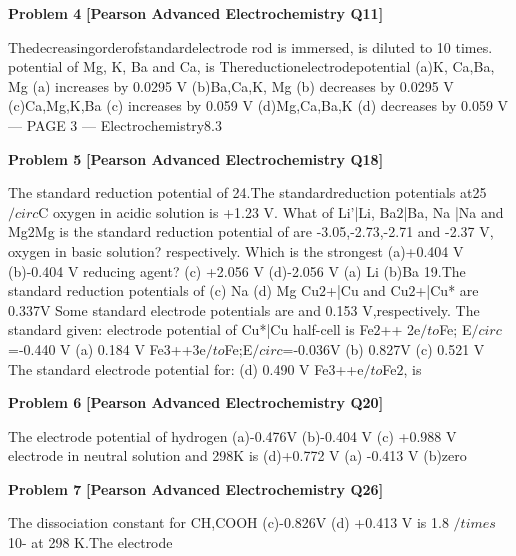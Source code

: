 \begin{problembox}
\textbf{Problem 4} \hfill \textbf{[Pearson Advanced Electrochemistry Q11]}
\label{q:ext-pearson-4}

Thedecreasingorderofstandardelectrode
rod is immersed, is diluted to 10 times.
potential of Mg, K, Ba and Ca, is
Thereductionelectrodepotential
(a)K, Ca,Ba, Mg
(a) increases by 0.0295 V
(b)Ba,Ca,K, Mg
(b) decreases by 0.0295 V
(c)Ca,Mg,K,Ba
(c) increases by 0.059 V
(d)Mg,Ca,Ba,K
(d) decreases by 0.059 V
--- PAGE 3 ---
Electrochemistry8.3
\end{problembox}

\begin{problembox}
\textbf{Problem 5} \hfill \textbf{[Pearson Advanced Electrochemistry Q18]}
\label{q:ext-pearson-5}

The standard reduction potential of
24.The standardreduction potentials at25$/circ$C
oxygen in acidic solution is +1.23 V. What
of Li'|Li, Ba$2$|Ba, Na |Na and Mg$2$Mg
is the standard reduction potential of
are -3.05,-2.73,-2.71 and -2.37 V,
oxygen in basic solution?
respectively. Which is the strongest
(a)+0.404 V
(b)-0.404 V
reducing agent?
(c) +2.056 V
(d)-2.056 V
(a) Li
(b)Ba
19.The standard reduction potentials of
(c) Na
(d) Mg
Cu$2$+|Cu and Cu$2$+|Cu* are 0.337V
Some standard electrode potentials are
and 0.153 V,respectively. The standard
given:
electrode potential of Cu*|Cu half-cell is
Fe$2$++ 2e$/to$Fe; E$/circ$=-0.440 V
(a) 0.184 V
Fe3++3e$/to$Fe;E$/circ$=-0.036V
(b) 0.827V
(c) 0.521 V
The standard electrode potential for:
(d) 0.490 V
Fe3++e$/to$Fe$2$, is
\end{problembox}

\begin{problembox}
\textbf{Problem 6} \hfill \textbf{[Pearson Advanced Electrochemistry Q20]}
\label{q:ext-pearson-6}

The electrode potential of hydrogen
(a)-0.476V
(b)-0.404 V
(c) +0.988 V
electrode in neutral solution and 298K is
(d)+0.772 V
(a) -0.413 V
(b)zero
\end{problembox}

\begin{problembox}
\textbf{Problem 7} \hfill \textbf{[Pearson Advanced Electrochemistry Q26]}
\label{q:ext-pearson-7}

The dissociation constant for CH,COOH
(c)-0.826V
(d) +0.413 V
is 1.8 $/times$ 10- at 298 K.The electrode
\end{problembox}

